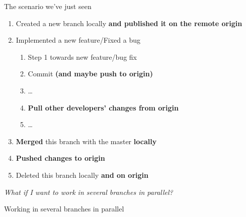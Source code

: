 \begin{frame}[fragile]{The scenario we've just seen}
	\begin{enumerate}
		\item Created a new branch locally \textbf{and published it on the remote origin}
		\item Implemented a new feature/Fixed a bug
		\begin{enumerate}
			\item Step 1 towards new feature/bug fix
			\item Commit \textbf{(and maybe push to origin)}
			\item \ldots
			\item \textbf{Pull other developers' changes from origin}
			\item \ldots
		\end{enumerate}
		\item \textbf{Merged} this branch with the master \textbf{locally}
		\item \textbf{Pushed changes to origin}
		\item Deleted this branch locally \textbf{and on origin}
	\end{enumerate}
	\pause
	\textit{What if I want to work in several branches in parallel?}
\end{frame}

\begin{frame}[fragile]{Working in several branches in parallel}
	\begin{tiny}
	\end{tiny}
\end{frame}